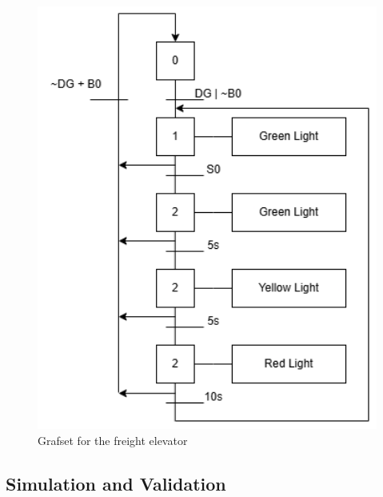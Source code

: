 \begin{figure}[H]
    \includegraphics[width=16cm]{Images/Q5/graftset.png}
    \centering
    \caption{Grafset for the freight elevator}
    \label{fig:grafset}
\end{figure}

\subsection{Simulation and Validation} \label{sec:Simulation_and_Validation}

